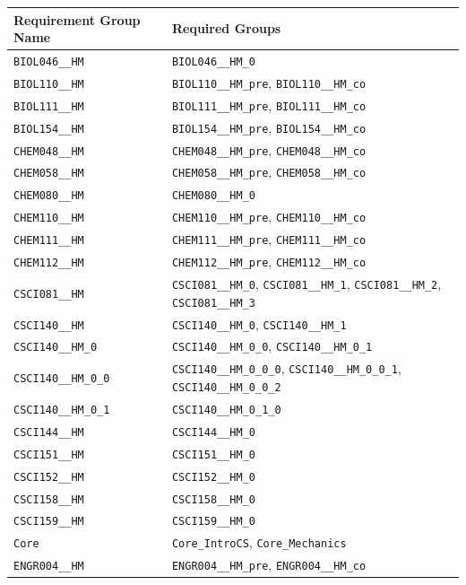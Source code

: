 \begin{longtable}{|p{4.4in}|p{4.4in}|}
    \hline
    Requirement Group Name & Required Groups\\\hline
    \verb|BIOL046__HM| & \verb|BIOL046__HM_0|\\\hline
    \verb|BIOL110__HM| & \verb|BIOL110__HM_pre|, \verb|BIOL110__HM_co|\\\hline
    \verb|BIOL111__HM| & \verb|BIOL111__HM_pre|, \verb|BIOL111__HM_co|\\\hline
    \verb|BIOL154__HM| & \verb|BIOL154__HM_pre|, \verb|BIOL154__HM_co|\\\hline
    \verb|CHEM048__HM| & \verb|CHEM048__HM_pre|, \verb|CHEM048__HM_co|\\\hline
    \verb|CHEM058__HM| & \verb|CHEM058__HM_pre|, \verb|CHEM058__HM_co|\\\hline
    \verb|CHEM080__HM| & \verb|CHEM080__HM_0|\\\hline
    \verb|CHEM110__HM| & \verb|CHEM110__HM_pre|, \verb|CHEM110__HM_co|\\\hline
    \verb|CHEM111__HM| & \verb|CHEM111__HM_pre|, \verb|CHEM111__HM_co|\\\hline
    \verb|CHEM112__HM| & \verb|CHEM112__HM_pre|, \verb|CHEM112__HM_co|\\\hline
    \verb|CSCI081__HM| & \verb|CSCI081__HM_0|, \verb|CSCI081__HM_1|, \verb|CSCI081__HM_2|, \verb|CSCI081__HM_3|\\\hline
    \verb|CSCI140__HM| & \verb|CSCI140__HM_0|, \verb|CSCI140__HM_1|\\\hline
    \verb|CSCI140__HM_0| & \verb|CSCI140__HM_0_0|, \verb|CSCI140__HM_0_1|\\\hline
    \verb|CSCI140__HM_0_0| & \verb|CSCI140__HM_0_0_0|, \verb|CSCI140__HM_0_0_1|, \verb|CSCI140__HM_0_0_2|\\\hline
    \verb|CSCI140__HM_0_1| & \verb|CSCI140__HM_0_1_0|\\\hline
    \verb|CSCI144__HM| & \verb|CSCI144__HM_0|\\\hline
    \verb|CSCI151__HM| & \verb|CSCI151__HM_0|\\\hline
    \verb|CSCI152__HM| & \verb|CSCI152__HM_0|\\\hline
    \verb|CSCI158__HM| & \verb|CSCI158__HM_0|\\\hline
    \verb|CSCI159__HM| & \verb|CSCI159__HM_0|\\\hline
    \verb|Core| & \verb|Core_IntroCS|, \verb|Core_Mechanics|\\\hline
    \verb|ENGR004__HM| & \verb|ENGR004__HM_pre|, \verb|ENGR004__HM_co|\\\hline

\end{longtable}
